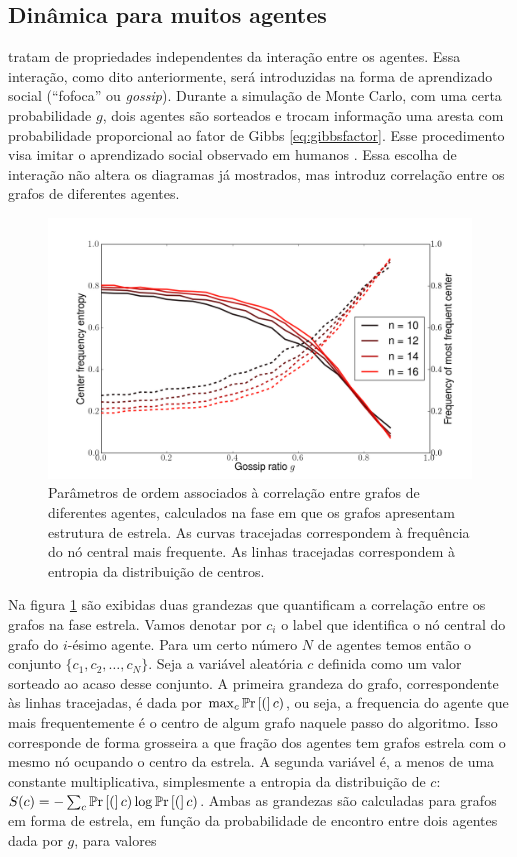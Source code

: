 \subsection{Dinâmica para muitos agentes } 

 tratam de propriedades independentes da interação entre os agentes. Essa interação, como dito anteriormente, será introduzidas na forma de aprendizado social (``fofoca'' ou \textit{gossip}). Durante a simulação de Monte Carlo, com uma certa probabilidade $g$, dois agentes são sorteados e trocam informação uma aresta com probabilidade proporcional ao fator de Gibbs \eqref{eq:gibbsfactor}. Esse procedimento visa imitar o aprendizado social observado em humanos \cite[-2em]{Dunbar2010book}. Essa escolha de interação não altera os diagramas já mostrados, mas introduz correlação entre os grafos de diferentes agentes. 
\begin{figure}
	\centering
	\includegraphics[width = 1\textwidth]{figuras/gossip.png}
 	\caption[Parâmetros de ordem associados à correlação entre grafos de diferentes agentes]{\label{fig:gossip} Parâmetros de ordem associados à correlação entre grafos de diferentes agentes, calculados na fase em que os grafos apresentam estrutura de estrela. As curvas tracejadas correspondem à frequência do nó central mais frequente. As linhas tracejadas correspondem à entropia da distribuição de centros.}
\end{figure}
Na figura \ref{fig:gossip} são exibidas duas grandezas que quantificam a correlação entre os grafos na fase estrela. Vamos denotar por $c_i$ o label que identifica o nó central do grafo do $i$-ésimo agente. Para um certo número $N$ de agentes temos então o conjunto $\{c_1, c_2, \ldots, c_N\}$. Seja a variável aleatória $c$ definida como um valor sorteado ao acaso desse conjunto. A primeira grandeza do grafo, correspondente às linhas tracejadas, é dada por $\max_{c} \mathbb{P}\mathrm{r}\left[(\right]c)$, ou seja, a frequencia do agente que mais frequentemente é o centro de algum grafo naquele passo do algoritmo. Isso corresponde de forma grosseira a que fração dos agentes tem grafos estrela com o mesmo nó ocupando o centro da estrela. A segunda variável é, a menos de uma constante multiplicativa, simplesmente a entropia da distribuição de $c$: $S(c) = -\sum_{c} \mathbb{P}\mathrm{r}\left[(\right]c) \log\mathbb{P}\mathrm{r}\left[(\right]c)$. Ambas as grandezas são calculadas para grafos em forma de estrela, em função da probabilidade de encontro entre dois agentes dada por $g$, para valores 
